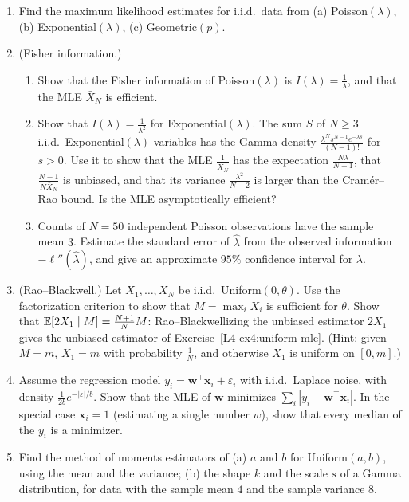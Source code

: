 \begin{enumerate}[leftmargin=*]
\begin{enumerate}[label=(\alph*)]
    \end{enumerate}
    \item \homework{} Find the maximum likelihood estimates for i.i.d.\ data from (a) Poisson$(\lambda)$, (b) Exponential$(\lambda)$, (c) Geometric$(p)$.
    \item\label{L4-ex4:fisher} \homework{} (Fisher information.)
    \begin{enumerate}[label=(\alph*)]
        \item Show that the Fisher information of Poisson$(\lambda)$ is $I(\lambda) = \frac{1}{\lambda}$, and that the MLE $\bar X_N$ is efficient.
        \item Show that $I(\lambda) = \frac{1}{\lambda^2}$ for Exponential$(\lambda)$. The sum $S$ of $N \geq 3$ i.i.d.\ Exponential$(\lambda)$ variables has the Gamma density $\frac{\lambda^N s^{N-1}e^{-\lambda s}}{(N - 1)!}$ for $s > 0$. Use it to show that the MLE $\frac{1}{\bar X_N}$ has the expectation $\frac{N\lambda}{N - 1}$, that $\frac{N - 1}{N\bar X_N}$ is unbiased, and that its variance $\frac{\lambda^2}{N - 2}$ is larger than the Cram\'er--Rao bound. Is the MLE asymptotically efficient?
        \item Counts of $N = 50$ independent Poisson observations have the sample mean $3$. Estimate the standard error of $\hat\lambda$ from the observed information $-\ell''(\hat\lambda)$, and give an approximate $95\%$ confidence interval for $\lambda$.
    \end{enumerate}
    \item (Rao--Blackwell.) Let $X_1, \ldots, X_N$ be i.i.d.\ Uniform$(0, \theta)$. Use the factorization criterion to show that $M = \max_i X_i$ is sufficient for $\theta$. Show that $\mathbb{E}[2X_1 \mid M] = \frac{N + 1}{N}M$: Rao--Blackwellizing the unbiased estimator $2X_1$ gives the unbiased estimator of Exercise~\ref{L4-ex4:uniform-mle}. (Hint: given $M = m$, $X_1 = m$ with probability $\frac{1}{N}$, and otherwise $X_1$ is uniform on $[0, m]$.)
    \item Assume the regression model $y_i = \mathbf{w}^\top\mathbf{x}_i + \varepsilon_i$ with i.i.d.\ Laplace noise, with density $\frac{1}{2b}e^{-|\varepsilon|/b}$. Show that the MLE of $\mathbf{w}$ minimizes $\sum_i |y_i - \mathbf{w}^\top\mathbf{x}_i|$. In the special case $\mathbf{x}_i = 1$ (estimating a single number $w$), show that every median of the $y_i$ is a minimizer.
    \item Find the method of moments estimators of (a) $a$ and $b$ for Uniform$(a, b)$, using the mean and the variance; (b) the shape $k$ and the scale $s$ of a Gamma distribution, for data with the sample mean $4$ and the sample variance $8$.

\end{enumerate}
